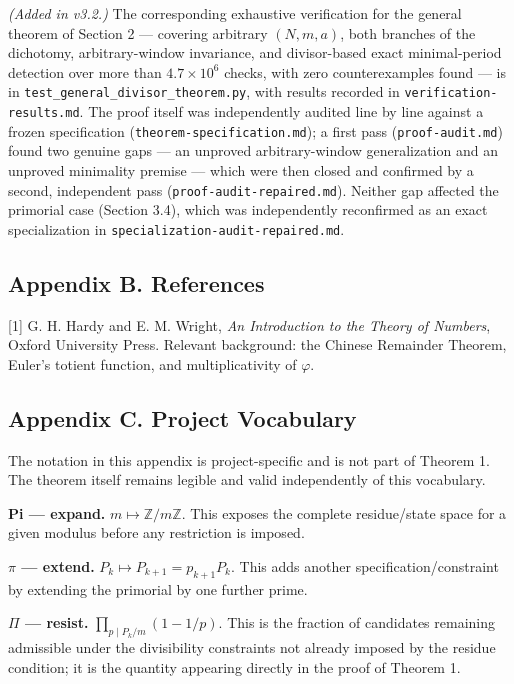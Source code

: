 \documentclass[
]{article}
\begin{document}
\emph{(Added in v3.2.)} The corresponding exhaustive verification for
the general theorem of Section 2 --- covering arbitrary \((N,m,a)\),
both branches of the dichotomy, arbitrary-window invariance, and
divisor-based exact minimal-period detection over more than
\(4.7\times10^6\) checks, with zero counterexamples found --- is in
\texttt{test\_general\_divisor\_theorem.py}, with results recorded in
\texttt{verification-results.md}. The proof itself was independently
audited line by line against a frozen specification
(\texttt{theorem-specification.md}); a first pass
(\texttt{proof-audit.md}) found two genuine gaps --- an unproved
arbitrary-window generalization and an unproved minimality premise ---
which were then closed and confirmed by a second, independent pass
(\texttt{proof-audit-repaired.md}). Neither gap affected the primorial
case (Section 3.4), which was independently reconfirmed as an exact
specialization in \texttt{specialization-audit-repaired.md}.

\subsection{Appendix B. References}\label{appendix-b.-references}

{[}1{]} G. H. Hardy and E. M. Wright, \emph{An Introduction to the
Theory of Numbers}, Oxford University Press. Relevant background: the
Chinese Remainder Theorem, Euler's totient function, and
multiplicativity of \(\varphi\).

\subsection{Appendix C. Project
Vocabulary}\label{appendix-c.-project-vocabulary}

The notation in this appendix is project-specific and is not part of
Theorem 1. The theorem itself remains legible and valid independently of
this vocabulary.

\textbf{Pi --- expand.} \(m \mapsto \mathbb Z/m\mathbb Z\). This exposes
the complete residue/state space for a given modulus before any
restriction is imposed.

\textbf{\(\pi\) --- extend.} \(P_k \mapsto P_{k+1}=p_{k+1}P_k\). This
adds another specification/constraint by extending the primorial by one
further prime.

\textbf{\(\Pi\) --- resist.} \(\prod_{p\mid P_k/m}(1-1/p)\). This is the
fraction of candidates remaining admissible under the divisibility
constraints not already imposed by the residue condition; it is the
quantity appearing directly in the proof of Theorem 1.
\end{document}
